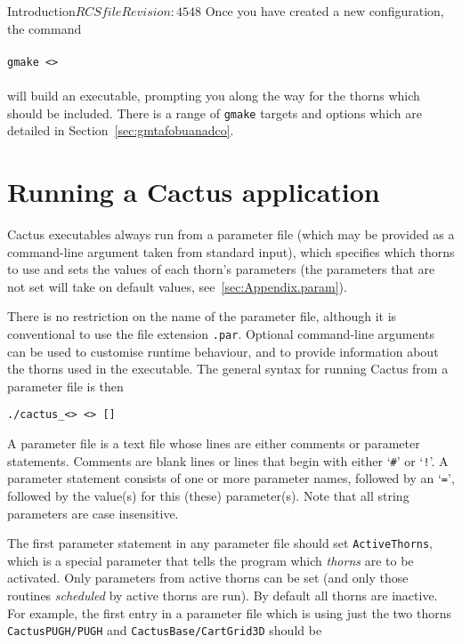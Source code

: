 \begin{cactuspart}{Introduction}{$RCSfile$}{$Revision: 4548 $}
Once you have created a new configuration, the command
\\ \\
\texttt{gmake <>}
\\ \\
will build an executable, prompting you along the way for the
thorns which should be included. There is a range of \texttt{gmake}
targets and options which are detailed in Section~\ref{sec:gmtafobuanadco}.


\section{Running a Cactus application}

Cactus executables always run from a parameter file (which may be
provided as a command-line argument taken from standard input), which
specifies which thorns to use and sets the values of each thorn's 
parameters (the parameters that are not set will take on default values, 
see~\ref{sec:Appendix.param}).

There is no restriction on the name
of the parameter file, although it is conventional to use the file
extension \texttt{.par}.  Optional command-line arguments can be used
to customise runtime behaviour, and to provide information about the
thorns used in the executable. The general syntax for running Cactus from
a parameter file is then

\texttt{./cactus\_<> <>
[]}

A parameter file is a text file whose lines are either comments
or parameter statements.
Comments are blank lines or lines that begin with either
`\texttt{\#}' or `\texttt{!}'.
A parameter statement consists of one or more parameter names, followed by
an `\texttt{=}', followed by the value(s) for this (these) parameter(s).
Note that all string parameters are case insensitive.

The first parameter statement in any parameter file should set \texttt{ActiveThorns},
which is a special parameter that tells the
program which \textit{thorns} are to be activated.  Only parameters from active
thorns can be set (and only those routines \textit{scheduled} by active thorns
are run).  By default all thorns are inactive. For example, the first
entry in a parameter file which is using just the two thorns
\texttt{CactusPUGH/PUGH} and \texttt{CactusBase/CartGrid3D} should be


\end{cactuspart}
